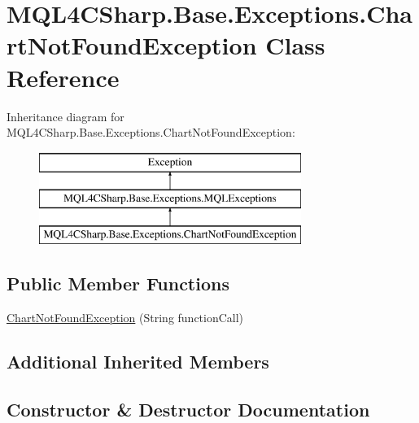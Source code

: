 \hypertarget{class_m_q_l4_c_sharp_1_1_base_1_1_exceptions_1_1_chart_not_found_exception}{}\section{M\+Q\+L4\+C\+Sharp.\+Base.\+Exceptions.\+Chart\+Not\+Found\+Exception Class Reference}
\label{class_m_q_l4_c_sharp_1_1_base_1_1_exceptions_1_1_chart_not_found_exception}
Inheritance diagram for M\+Q\+L4\+C\+Sharp.\+Base.\+Exceptions.\+Chart\+Not\+Found\+Exception\+:\begin{figure}[H]
\begin{center}
\leavevmode
\includegraphics[height=3.000000cm]{class_m_q_l4_c_sharp_1_1_base_1_1_exceptions_1_1_chart_not_found_exception}
\end{center}
\end{figure}
\subsection*{Public Member Functions}
\begin{DoxyCompactItemize}
\item 
\hyperlink{class_m_q_l4_c_sharp_1_1_base_1_1_exceptions_1_1_chart_not_found_exception_a8aa4e20bdad36feeed19763fa3227036}{Chart\+Not\+Found\+Exception} (String function\+Call)
\end{DoxyCompactItemize}
\subsection*{Additional Inherited Members}


\subsection{Constructor \& Destructor Documentation}
